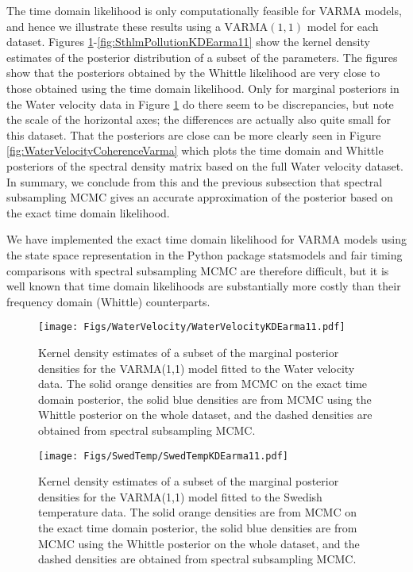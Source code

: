 \documentclass[11pt,english,oneside]{amsart}
\numberwithin{equation}{section}
\theoremstyle{plain}
\numberwithin{equation}{section}
\begin{document}
The time domain likelihood is only computationally feasible for VARMA models, and hence we illustrate these results using a $\mathrm{VARMA}(1, 1)$ model for each dataset. Figures \ref{fig:WaterVelocityKDEarma11}-\ref{fig:SthlmPollutionKDEarma11} show the kernel density estimates of the posterior distribution of a subset of the parameters. The figures show that the posteriors obtained by the Whittle likelihood are very close to those obtained using the time domain likelihood. Only for marginal posteriors in the Water velocity data in Figure \ref{fig:WaterVelocityKDEarma11} do there seem to be discrepancies, but note the scale of the horizontal axes; the differences are actually also quite small for this dataset. That the posteriors are close can be more clearly seen in Figure \ref{fig:WaterVelocityCoherenceVarma} which plots the time domain and Whittle posteriors of the spectral density matrix based on the full Water velocity dataset. In summary, we conclude from this and the previous subsection that spectral subsampling MCMC gives an accurate approximation of the posterior based on the exact time domain likelihood. 

We have implemented the exact time domain likelihood for VARMA models using the state space representation in the Python package {\sf statsmodels} and fair timing comparisons with spectral subsampling MCMC are therefore difficult, but it is well known that time domain likelihoods are substantially more costly than their frequency domain (Whittle) counterparts. 

\begin{figure}
    \texttt{[image: Figs/WaterVelocity/WaterVelocityKDEarma11.pdf]}
    \caption{Kernel density estimates of a subset of the marginal posterior densities for the VARMA(1,1) model fitted to the Water velocity data. The solid orange densities are from MCMC on the exact time domain posterior, the solid blue densities are from MCMC using the Whittle posterior on the whole dataset, and the dashed densities are obtained from spectral subsampling MCMC.}\label{fig:WaterVelocityKDEarma11}
\end{figure}

\begin{figure}
    \texttt{[image: Figs/SwedTemp/SwedTempKDEarma11.pdf]}
    \caption{Kernel density estimates of a subset of the marginal posterior densities for the VARMA(1,1) model fitted to the Swedish temperature data. The solid orange densities are from MCMC on the exact time domain posterior, the solid blue densities are from MCMC using the Whittle posterior on the whole dataset, and the dashed densities are obtained from spectral subsampling MCMC.}\label{fig:SwedTempKDEarma11}
\end{figure}
\end{document}
